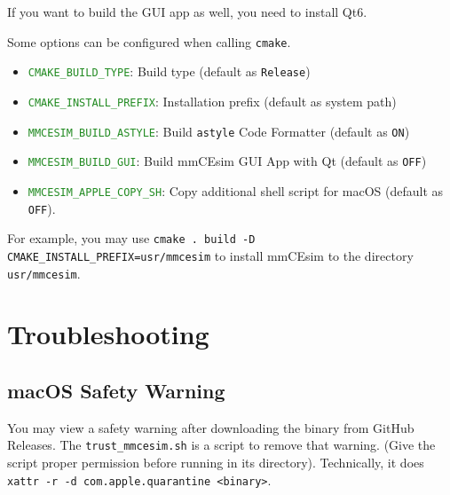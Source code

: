 If you want to build the GUI app as well, you need to install Qt6.

\newpage
Some options can be configured when calling \texttt{cmake}.
\begin{itemize}
  \item \textcolor{forestgreen}{\texttt{CMAKE\_BUILD\_TYPE}}: Build type (default as \texttt{Release})
  \item \textcolor{forestgreen}{\texttt{CMAKE\_INSTALL\_PREFIX}}: Installation prefix (default as system path)
  \item \textcolor{forestgreen}{\texttt{MMCESIM\_BUILD\_ASTYLE}}: Build \texttt{astyle} Code Formatter (default as \texttt{ON})
  \item \textcolor{forestgreen}{\texttt{MMCESIM\_BUILD\_GUI}}: Build mmCEsim GUI App with Qt (default as \texttt{OFF})
  \item \textcolor{forestgreen}{\texttt{MMCESIM\_APPLE\_COPY\_SH}}: Copy additional shell script for macOS (default as \texttt{OFF}).
\end{itemize}

For example, you may use \lstinline[morekeywords={cmake}]{cmake . build -D CMAKE_INSTALL_PREFIX=usr/mmcesim}
to install mmCEsim to the directory \texttt{usr/mmcesim}.

\section{Troubleshooting}
\subsection{macOS Safety Warning}
You may view a safety warning after downloading the binary from GitHub Releases.
The \texttt{trust\_mmcesim.sh} is a script to remove that warning.
(Give the script proper permission before running in its directory).
Technically, it does \lstinline[morekeywords={xattr}]{xattr -r -d com.apple.quarantine <binary>}.
